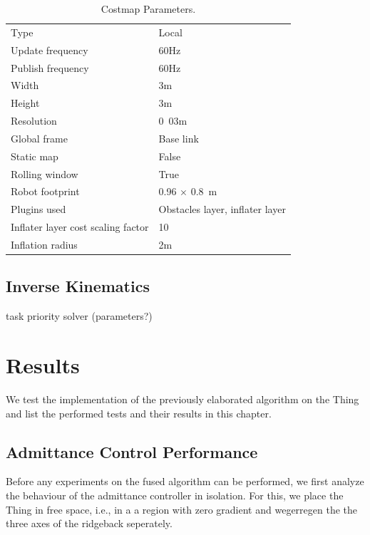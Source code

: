 \begin{table}[h]
\begin{center}
 \caption{Costmap Parameters.}\vspace{1ex}
 \label{tab:costmap_params}
 \begin{tabular}{ll}
 \hline
Type & Local \\
Update frequency & \unit{60}{Hz} \\
Publish frequency & \unit{60}{Hz} \\ 
Width & \unit{3}{m} \\
Height & \unit{3}{m} \\
Resolution & \unit{0.03}{m} \\
Global frame & Base link \\
Static map & False \\
Rolling window & True \\
Robot footprint & \unit{0.96 $\times$ 0.8}{m} \\
Plugins used & Obstacles layer, inflater layer \\
Inflater layer cost scaling factor & 10  \\
Inflation radius & \unit{2}{m} \\
 \hline
 \end{tabular}
\end{center}
\end{table}

\section{Inverse Kinematics}
task priority solver (parameters?)
\chapter{Results}
We test the implementation of the previously elaborated algorithm on the Thing and list the performed tests and their results in this chapter.
\section{Admittance Control Performance}
Before any experiments on the fused algorithm can be performed, we first analyze the behaviour of the admittance controller in isolation. For this, we place the Thing in free space, i.e., in a a region with zero gradient and wegerregen the the three axes of the ridgeback seperately.

